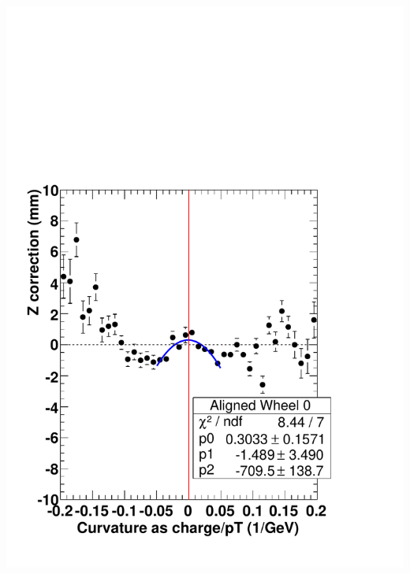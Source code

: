 \documentclass[compress]{beamer}
\begin{document}
\begin{frame}
\begin{columns}
\includegraphics[width=\linewidth]{ZvsCurvature_wh0_aligned.pdf}
\end{columns}
\label{numpages}
\end{frame}


\end{document}
